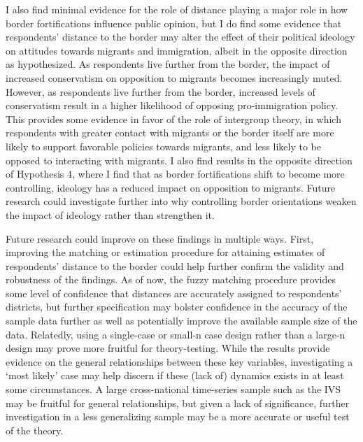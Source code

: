 \documentclass[12pt,]{article}
\begin{document}
I also find minimal evidence for the role of distance playing a major
role in how border fortifications influence public opinion, but I do
find some evidence that respondents' distance to the border may alter
the effect of their political ideology on attitudes towards migrants and
immigration, albeit in the opposite direction as hypothesized. As
respondents live further from the border, the impact of increased
conservatism on opposition to migrants becomes increasingly muted.
However, as respondents live further from the border, increased levels
of conservatism result in a higher likelihood of opposing
pro-immigration policy. This provides some evidence in favor of the role
of intergroup theory, in which respondents with greater contact with
migrants or the border itself are more likely to support favorable
policies towards migrants, and less likely to be opposed to interacting
with migrants. I also find results in the opposite direction of
Hypothesis 4, where I find that as border fortifications shift to become
more controlling, ideology has a reduced impact on opposition to
migrants. Future research could investigate further into why controlling
border orientations weaken the impact of ideology rather than strengthen
it.

Future research could improve on these findings in multiple ways. First,
improving the matching or estimation procedure for attaining estimates
of respondents' distance to the border could help further confirm the
validity and robustness of the findings. As of now, the fuzzy matching
procedure provides some level of confidence that distances are
accurately assigned to respondents' districts, but further specification
may bolster confidence in the accuracy of the sample data further as
well as potentially improve the available sample size of the data.
Relatedly, using a single-case or small-n case design rather than a
large-n design may prove more fruitful for theory-testing. While the
results provide evidence on the general relationships between these key
variables, investigating a `most likely' case may help discern if these
(lack of) dynamics exists in at least some circumstances. A large
cross-national time-series sample such as the IVS may be fruitful for
general relationships, but given a lack of significance, further
investigation in a less generalizing sample may be a more accurate or
useful test of the theory.
\end{document}
